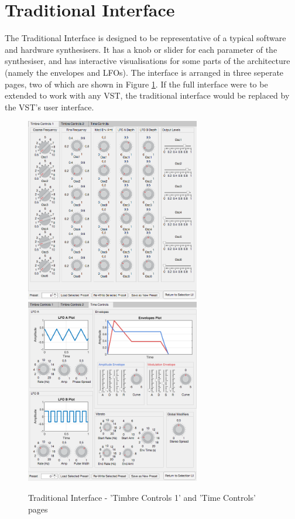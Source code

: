 \documentclass[11pt, oneside]{report}   	%
\begin{document}
\section{Traditional Interface}
The Traditional Interface is designed to be representative of a typical software and hardware synthesisers. It has a knob or slider for each parameter of the synthesiser, and has interactive visualisations for some parts of the architecture (namely the envelopes and LFOs). The interface is arranged in three seperate pages, two of which are shown in Figure \ref{fig:TraditionalInterface}. 
If the full interface were to be extended to work with any VST, the traditional interface would be replaced by the VST's user interface. 
\begin{figure}[h] 
	\centering
	\hspace*{-0.2cm}
\includegraphics[width = 3in]{TraditionalUI1.png}
\hspace*{0.2cm}
	\includegraphics[width = 3in]{TraditionalUI3.png}
	\caption{Traditional Interface - 'Timbre Controls 1' and 'Time Controls' pages}
	\label{fig:TraditionalInterface}
\end{figure}
\end{document}

